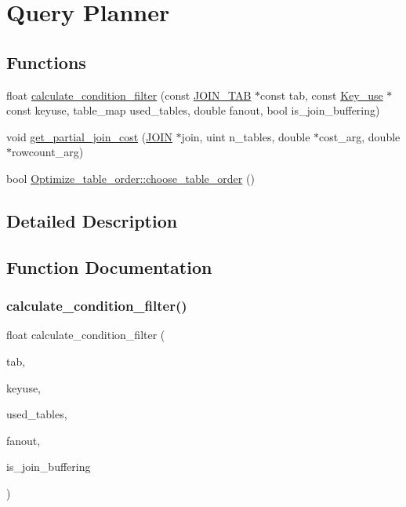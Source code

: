 \hypertarget{group__Query__Planner}{}\section{Query Planner}
\label{group__Query__Planner}
\subsection*{Functions}
\begin{DoxyCompactItemize}
\item 
float \mbox{\hyperlink{group__Query__Planner_gab40ad85a04512dd2ac293b723d96fb54}{calculate\+\_\+condition\+\_\+filter}} (const \mbox{\hyperlink{classJOIN__TAB}{J\+O\+I\+N\+\_\+\+T\+AB}} $\ast$const tab, const \mbox{\hyperlink{classKey__use}{Key\+\_\+use}} $\ast$const keyuse, table\+\_\+map used\+\_\+tables, double fanout, bool is\+\_\+join\+\_\+buffering)
\item 
void \mbox{\hyperlink{group__Query__Planner_ga945145266f4a865c166692aea42818ed}{get\+\_\+partial\+\_\+join\+\_\+cost}} (\mbox{\hyperlink{classJOIN}{J\+O\+IN}} $\ast$join, uint n\+\_\+tables, double $\ast$cost\+\_\+arg, double $\ast$rowcount\+\_\+arg)
\item 
bool \mbox{\hyperlink{group__Query__Planner_gaf585184987b0097465505d600394b8f3}{Optimize\+\_\+table\+\_\+order\+::choose\+\_\+table\+\_\+order}} ()
\end{DoxyCompactItemize}


\subsection{Detailed Description}


\subsection{Function Documentation}
\mbox{\label{group__Query__Planner_gab40ad85a04512dd2ac293b723d96fb54}} 
\subsubsection{\texorpdfstring{calculate\+\_\+condition\+\_\+filter()}{calculate\_condition\_filter()}}
{\footnotesize\ttfamily float calculate\+\_\+condition\+\_\+filter (\begin{DoxyParamCaption}\item[{const \mbox{\hyperlink{classJOIN__TAB}{J\+O\+I\+N\+\_\+\+T\+AB}} $\ast$const}]{tab,  }\item[{const \mbox{\hyperlink{classKey__use}{Key\+\_\+use}} $\ast$const}]{keyuse,  }\item[{table\+\_\+map}]{used\+\_\+tables,  }\item[{double}]{fanout,  }\item[{bool}]{is\+\_\+join\+\_\+buffering }\end{DoxyParamCaption})}

